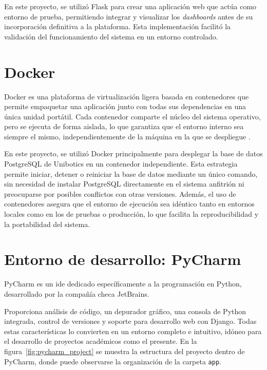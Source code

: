 \documentclass[a4paper, 12pt]{book}
\begin{document}
En este proyecto, se utilizó Flask para crear una aplicación web que actúa como entorno de prueba, permitiendo integrar y visualizar los \textit{dashboards} antes de su incorporación definitiva a la plataforma. Esta implementación facilitó la validación del funcionamiento del sistema en un entorno controlado.



\section{Docker}
\label{sec:Docker}

Docker es una plataforma de virtualización ligera basada en contenedores que permite empaquetar una aplicación junto con todas sus dependencias en una única unidad portátil. Cada contenedor comparte el núcleo del sistema operativo, pero se ejecuta de forma aislada, lo que garantiza que el entorno interno sea siempre el mismo, independientemente de la máquina en la que se despliegue \cite{nickoloff2019docker}.

En este proyecto, se utilizó Docker principalmente para desplegar la base de datos PostgreSQL de Unibotics en un contenedor independiente. Esta estrategia permite iniciar, detener o reiniciar la base de datos mediante un único comando, sin necesidad de instalar PostgreSQL directamente en el sistema anfitrión ni preocuparse por posibles conflictos con otras versiones. Además, el uso de contenedores asegura que el entorno de ejecución sea idéntico tanto en entornos locales como en los de pruebas o producción, lo que facilita la reproducibilidad y la portabilidad del sistema.


\section{Entorno de desarrollo: PyCharm}
\label{sec:entorno_de_desarrollo}

PyCharm es un \gls{ide} dedicado específicamente a la programación en Python, desarrollado por la compañía checa JetBrains.

Proporciona análisis de código, un depurador gráfico, una consola de Python integrada, control de versiones y soporte para desarrollo web con Django. Todas estas características lo convierten en un entorno completo e intuitivo, idóneo para el desarrollo de proyectos académicos como el presente. En la figura~\ref{fig:pycharm_project} se muestra la estructura del proyecto dentro de PyCharm, donde puede observarse la organización de la carpeta \texttt{app}.
\end{document}
